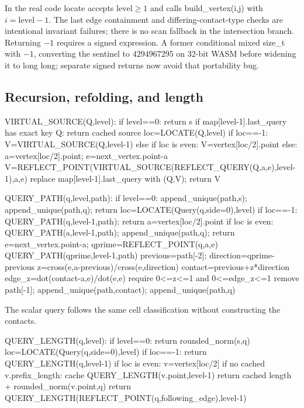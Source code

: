 \documentclass[12pt,a4paper]{article}
\newcommand{\code}[1]{{\ttfamily\color{codekw}#1}}
\begin{document}
In the real code \code{locate} accepts \(\mathrm{level}\ge1\) and calls \code{build\_vertex(i,j)} with \(i=\mathrm{level}-1\). The last edge containment and differing-contact-type checks are intentional invariant failures; there is no scan fallback in the intersection branch. Returning \(-1\) requires a signed expression. A former conditional mixed \code{size\_t} with \(-1\), converting the sentinel to \(4294967295\) on 32-bit WASM before widening it to \code{long long}; separate signed returns now avoid that portability bug.

\subsection{Recursion, refolding, and length}
\begin{pseudo}
VIRTUAL_SOURCE(Q,level):
  if level==0: return s
  if map[level-1].last_query has exact key Q: return cached source
  loc=LOCATE(Q,level)
  if loc==-1: V=VIRTUAL_SOURCE(Q,level-1)
  else if loc is even: V=vertex[loc/2].point
  else:
      a=vertex[loc/2].point; e=next_vertex.point-a
      V=REFLECT_POINT(VIRTUAL_SOURCE(REFLECT_QUERY(Q,a,e),level-1),a,e)
  replace map[level-1].last_query with (Q,V); return V

QUERY_PATH(q,level,path):
  if level==0: append_unique(path,s); append_unique(path,q); return
  loc=LOCATE(Query(q,side=0),level)
  if loc==-1: QUERY_PATH(q,level-1,path); return
  a=vertex[loc/2].point
  if loc is even:
      QUERY_PATH(a,level-1,path); append_unique(path,q); return
  e=next_vertex.point-a; qprime=REFLECT_POINT(q,a,e)
  QUERY_PATH(qprime,level-1,path)
  previous=path[-2]; direction=qprime-previous
  z=cross(e,a-previous)/cross(e,direction)
  contact=previous+z*direction
  edge_z=dot(contact-a,e)/dot(e,e)
  require 0<=z<=1 and 0<=edge_z<=1
  remove path[-1]; append_unique(path,contact); append_unique(path,q)
\end{pseudo}

The scalar query follows the same cell classification without constructing the contacts.

\Needspace{68mm}
\begin{pseudo}
QUERY_LENGTH(q,level):
  if level==0: return rounded_norm(s,q)
  loc=LOCATE(Query(q,side=0),level)
  if loc==-1: return QUERY_LENGTH(q,level-1)
  if loc is even:
      v=vertex[loc/2]
      if no cached v.prefix_length: cache QUERY_LENGTH(v.point,level-1)
      return cached length + rounded_norm(v.point,q)
  return QUERY_LENGTH(REFLECT_POINT(q,following_edge),level-1)
\end{pseudo}
\end{document}
